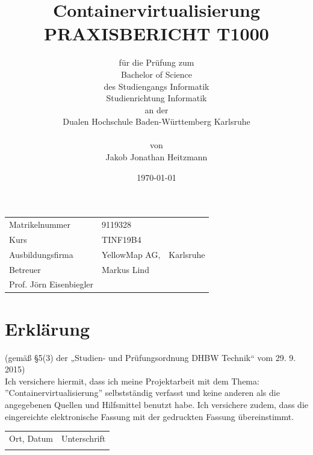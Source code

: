 \documentclass[12pt,a4paper]{scrartcl}
\title{\Large{\bfseries Containervirtualisierung\\}\vspace{1cm}
	\large PRAXISBERICHT T1000\vspace{1cm}}
\author{
	\normalsize für die Prüfung zum\\
	\normalsize Bachelor of Science\\
	\normalsize des Studiengangs Informatik\\
	\normalsize Studienrichtung Informatik\\
	\normalsize an der\\
	\normalsize Dualen Hochschule Baden-Württemberg Karlsruhe\\\\
	\normalsize von\\
	\normalsize Jakob Jonathan Heitzmann
}
\date{\today}
\begin{document}
\maketitle
\vspace*{\fill}
\thispagestyle{empty}



\begin{tabular}{p{5cm}ll}
	Matrikelnummer & 9119328\\
	Kurs & TINF19B4\\
	Ausbildungsfirma & YellowMap AG, & Karlsruhe\\
	Betreuer & Markus Lind\\
	Prof. Jörn Eisenbiegler
\end{tabular}

\newpage


\section*{Erklärung}
(gemäß §5(3) der „Studien- und Prüfungsordnung DHBW Technik“ vom 29. 9. 2015)\\
Ich versichere hiermit, dass ich meine Projektarbeit mit dem Thema: ''Containervirtualisierung'' selbstständig verfasst und keine anderen als die angegebenen Quellen und Hilfsmittel benutzt habe. Ich versichere zudem, dass die eingereichte elektronische Fassung mit der gedruckten Fassung übereinstimmt.\\

\vspace*{2.5cm}

\begin{tabular}{lr}
\hline
\rule{0pt}{2ex}
Ort, Datum & Unterschrift
\\
\hspace{90mm} & \hspace{50mm} 
\end{tabular}
\newpage

\tableofcontents
{}
\newpage
\listoffigures
{}
\newpage
\printglossary
{}
\newpage

\end{document}
